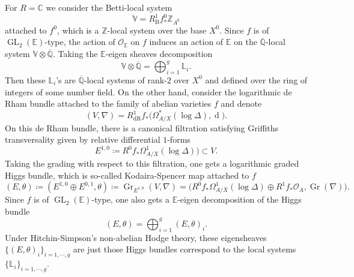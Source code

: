\documentclass[12pt,twoside]{book}
\theoremstyle{plain}
\theoremstyle{definition}
\theoremstyle{remark}
\newcommand{\bC}{{\mathbb C}}
\newcommand{\bL}{{\mathbb L}}
\newcommand{\bV}{{\mathbb V}}
\newcommand{\bZ}{{\mathbb Z}}
\newcommand{\mO}{{\mathcal O}}
\DeclareMathOperator\rmd{d}
\DeclareMathOperator\GL{GL}
\DeclareMathOperator\Gr{Gr}
\newcommand{\dR}{\mathrm{dR}}
\newcommand{\Qbar}{{\overline{\mathbb Q}}}
\numberwithin{equation}{section}
\def\EK{{\mathbb E}}
\begin{document}
For $R= \bC$ we consider the Betti-local system
\[\bV= R^1_\mathrm{B}f^0_* \bZ_{A^0}\]
attached to $f^0$, which is a $\bZ$-local system over the base $X^0$. Since $f$ is of $\GL_2(\EK)$-type, the action of $\mO_\EK$ on $f$ induces an action of $\EK$ on the $\Qbar$-local system $\bV\otimes\Qbar$. Taking the $\EK$-eigen sheaves decomposition
\[\bV\otimes\Qbar= \bigoplus_{i=1}^g \bL_i.\]
Then these $\bL_i$'s are $\Qbar$-local systems of rank-$2$ over $X^0$ and defined over the ring of integers of some number field. On the other hand, consider the logarithmic de Rham bundle attached to the family of abelian varieties $f$ and denote
\[(V,\nabla)= R^1_\dR f_*\Big(\Omega^*_{A/X}(\log\Delta),\rmd\Big).\]
On this de Rham bundle, there is a canonical filtration satisfying Griffiths transversality given by relative differential $1$-forms
\[E^{1,0}\coloneqq R^0f_* \Omega^1_{A/X}(\log\Delta))\subset V.\]
Taking the grading with respect to this filtration, one gets a logarithmic graded Higgs bundle, which is so-called Kodaira-Spencer map attached to $f$
\begin{equation} \label{equ:KS}
(E,\theta)\coloneqq(E^{1,0} \oplus E^{0,1},\theta)\coloneqq \Gr_{E^{1,0}} (V,\nabla) = \Big(R^0f_*\Omega^1_{A/X}(\log\Delta)\oplus R^1f_*\mO_A,\Gr(\nabla)\Big).
\end{equation}
Since $f$ is of $\GL_2(\EK)$-type, one also gets a $\EK$-eigen decomposition of the Higgs bundle
\begin{equation} \label{equ:decomp_Higgs}
(E,\theta)=\bigoplus_{i=1}^{g} (E,\theta)_i.
\end{equation}
Under Hitchin-Simpson's non-abelian Hodge theory, these eigensheaves $\{(E,\theta)_i\}_{i=1,\cdots,g}$ are just those Higgs bundles correspond to the local systems $\{\bL_i\}_{i=1,\cdots,g}$.
\end{document}
